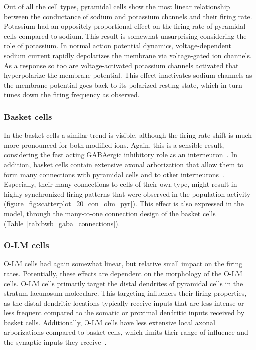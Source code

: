 Out of all the cell types, pyramidal cells show the most linear relationship between the conductance of sodium
and potassium channels and their firing rate. Potassium had an oppositely proportional effect on the firing rate of
pyramidal cells compared to sodium. This result is somewhat unsurprising considering the role of potassium. In normal action potential
dynamics, voltage-dependent sodium current rapidly depolarizes the membrane via voltage-gated ion channels. As a response so too are
voltage-activated potassium channels activated that hyperpolarize the membrane potential. This effect inactivates sodium channels
as the membrane potential goes back to its polarized resting state, which in turn tunes down the firing frequency as observed.

\subsubsection{Basket cells}
In the basket cells a similar trend is visible, although the firing rate shift is much more pronounced for both modified ions.
Again, this is a sensible result, considering the fast acting GABAergic inhibitory role as an interneuron~\parencite{wangGammaOscillationSynaptic1996}.
In addition, basket cells contain extensive axonal arborization that allow them to form many connections with pyramidal cells and
to other interneurons~\parencite{tukkerDistinctDendriticArborization2013}. Especially, their many connections to cells of their own type,
might result in highly synchronized firing patterns that were observed in the population activity (figure~\ref{fig:scatterplot_20_con_olm_pyr}).
This effect is also expressed in the model, through the many-to-one connection design of the basket cells (Table~\ref{tab:bwb_gaba_connections}).

\subsubsection{O-LM cells}
O-LM cells had again somewhat linear, but relative small impact on the firing rates.
Potentially, these effects are dependent on the morphology of the O-LM cells.
O-LM cells primarily target the distal dendrites of pyramidal cells in the stratum lacunosum moleculare.
This targeting influences their firing properties, as the distal dendritic locations typically receive inputs that are less intense or
less frequent compared to the somatic or proximal dendritic inputs received by basket cells. Additionally, O-LM cells have less extensive
local axonal arborizations compared to basket cells, which limits their range of influence and the synaptic inputs they receive~\parencite{saragaActiveDendritesSpike2003}.

